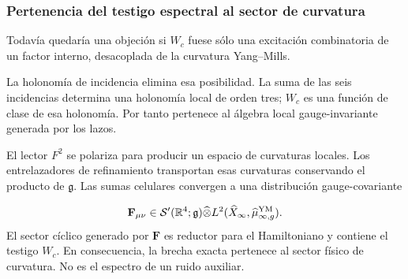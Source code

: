 \subsubsection{Pertenencia del testigo espectral al sector de curvatura}
Todavía quedaría una objeción si \(W_c\) fuese sólo una excitación combinatoria de un factor interno, desacoplada de la curvatura Yang–Mills.\par
La holonomía de incidencia elimina esa posibilidad. La suma de las seis incidencias determina una holonomía local de orden tres; \(W_c\) es una función de clase de esa holonomía. Por tanto pertenece al álgebra local gauge-invariante generada por los lazos.\par
El lector \(F^2\) se polariza para producir un espacio de curvaturas locales. Los entrelazadores de refinamiento transportan esas curvaturas conservando el producto de \(\mathfrak g\). Las sumas celulares convergen a una distribución gauge-covariante\par
\[
\mathbf F_{\mu\nu}
\in
\mathcal S'(\mathbb R^4;\mathfrak g)
\widehat\otimes
L^2(\widehat X_\infty,\widehat\mu_{\infty,g}^{\rm YM}).
\]
El sector cíclico generado por \(\mathbf F\) es reductor para el Hamiltoniano y contiene el testigo \(W_c\). En consecuencia, la brecha exacta pertenece al sector físico de curvatura. No es el espectro de un ruido auxiliar.\par
{}
